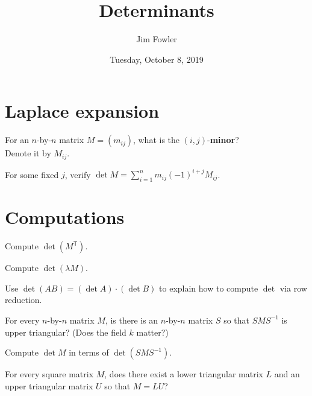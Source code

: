 \documentclass{homework}
\author{Jim Fowler}
\title{Determinants}
\date{Tuesday, October 8, 2019}
\begin{document}
\maketitle

\section{Laplace expansion}

\begin{problem}
  For an $n$-by-$n$ matrix $M = (m_{ij})$, what is the $(i,j)$-\textbf{minor}? \\
  Denote it by $M_{ij}$.
\end{problem}

\begin{problem}  
  For some fixed $j$, verify $\det M = \sum_{i=1}^n m_{ij} (-1)^{i+j} M_{ij}$.
\end{problem}

\section{Computations}

\begin{problem}
  Compute $\det(M^{\textsf{T}})$.
\end{problem}

\begin{problem}
  Compute $\det(\lambda M)$.
\end{problem}

\begin{problem}
  Use $\det(AB) = (\det A) \cdot (\det B)$ to explain how to compute
  $\det$ via row reduction.
\end{problem}

\begin{problem}
  For every $n$-by-$n$ matrix $M$, is there is an $n$-by-$n$ matrix $S$
  so that $SMS^{-1}$ is upper triangular?  (Does the field $k$ matter?)
\end{problem}

\begin{problem}
  Compute $\det M$ in terms of $\det \left( SMS^{-1} \right)$.
\end{problem}

\begin{problem}
  For every square matrix $M$, does there exist a lower triangular
  matrix $L$ and an upper triangular matrix $U$ so that $M = LU$? %
\end{problem}
\end{document}

